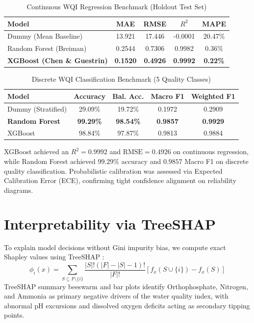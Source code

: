 \documentclass[conference]{IEEEtran}
\begin{document}
\begin{table}[htbp]
\caption{Continuous WQI Regression Benchmark (Holdout Test Set)}
\begin{center}
\begin{tabular}{lcccc}
\toprule
\textbf{Model} & \textbf{MAE} & \textbf{RMSE} & \textbf{$R^2$} & \textbf{MAPE} \\
\midrule
Dummy (Mean Baseline) & 13.921 & 17.446 & -0.0001 & 20.47\% \\
Random Forest (Breiman) & 0.2544 & 0.7306 & 0.9982 & 0.36\% \\
\textbf{XGBoost (Chen \& Guestrin)} & \textbf{0.1520} & \textbf{0.4926} & \textbf{0.9992} & \textbf{0.22\%} \\
\bottomrule
\end{tabular}
\label{tab:regression_results}
\end{center}
\end{table}

\begin{table}[htbp]
\caption{Discrete WQI Classification Benchmark (5 Quality Classes)}
\begin{center}
\begin{tabular}{lcccc}
\toprule
\textbf{Model} & \textbf{Accuracy} & \textbf{Bal. Acc.} & \textbf{Macro F1} & \textbf{Weighted F1} \\
\midrule
Dummy (Stratified) & 29.09\% & 19.72\% & 0.1972 & 0.2909 \\
\textbf{Random Forest} & \textbf{99.29\%} & \textbf{98.54\%} & \textbf{0.9857} & \textbf{0.9929} \\
XGBoost & 98.84\% & 97.87\% & 0.9813 & 0.9884 \\
\bottomrule
\end{tabular}
\label{tab:classification_results}
\end{center}
\end{table}

XGBoost achieved an $R^2 = 0.9992$ and $\text{RMSE} = 0.4926$ on continuous regression, while Random Forest achieved $99.29\%$ accuracy and $0.9857$ Macro F1 on discrete quality classification. Probabilistic calibration was assessed via Expected Calibration Error (ECE), confirming tight confidence alignment on reliability diagrams.

\section{Interpretability via TreeSHAP}
To explain model decisions without Gini impurity bias, we compute exact Shapley values using TreeSHAP \cite{lundberg2020local}:
\begin{equation}
\phi_i(x) = \sum_{S \subseteq F \setminus \{i\}} \frac{|S|!(|F| - |S| - 1)!}{|F|!} [f_x(S \cup \{i\}) - f_x(S)]
\end{equation}
TreeSHAP summary beeswarm and bar plots identify Orthophosphate, Nitrogen, and Ammonia as primary negative drivers of the water quality index, with abnormal pH excursions and dissolved oxygen deficits acting as secondary tipping points.
\end{document}
